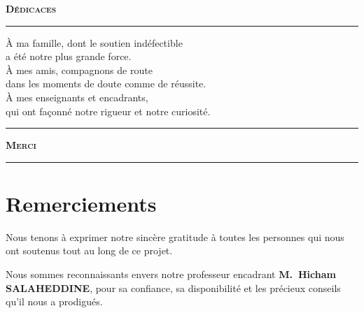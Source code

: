 \documentclass[12pt,a4paper]{report}
\begin{document}
\begin{center}
  {\large\bfseries\color{mainblue}\scshape Dédicaces}
\end{center}

\vspace{0.6cm}
\noindent\textcolor{mainblue!40}{\rule{\linewidth}{0.4pt}}
\vspace{1.4cm}

\begin{flushright}
\begin{minipage}{0.72\textwidth}
\itshape\large\color{darkgray}

À ma famille, dont le soutien indéfectible\\
a été notre plus grande force.\\[1em]
À mes amis, compagnons de route\\
dans les moments de doute comme de réussite.\\[1em]
À mes enseignants et encadrants,\\
qui ont façonné notre rigueur et notre curiosité.

\end{minipage}
\end{flushright}

\vfill

\noindent\textcolor{mainblue!40}{\rule{\linewidth}{0.4pt}}

\vspace{0.6cm}

\begin{center}
  \textcolor{mainblue}{\large\bfseries\scshape Merci}
\end{center}

\vspace{0.4cm}
\noindent\textcolor{mainblue}{\rule{\linewidth}{1.2pt}}

\newpage
\chapter*{Remerciements}
\thispagestyle{fancy}

Nous tenons à exprimer notre sincère gratitude à toutes les personnes qui nous ont
soutenus tout au long de ce projet.

Nous sommes reconnaissants envers notre professeur encadrant \textbf{M.~Hicham SALAHEDDINE},
pour sa confiance, sa disponibilité et les précieux conseils qu'il nous a prodigués.
\end{document}
